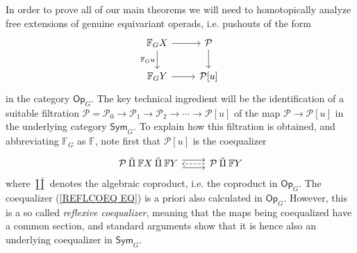 \documentclass[a4paper,10pt]{article}%
\begin{document}
In order to prove all of our main theorems
we will need to homotopically analyze free extensions 
of genuine equivariant operads,
i.e. pushouts of the form
\begin{equation}
  \label{FREE_FG_EXT_EQ}
  \begin{tikzcd}
    \mathbb{F}_G X \ar{r} \ar{d}[swap]{\mathbb{F}_G u} & \mathcal{P} \ar{d}
    \\
    \mathbb{F}_G Y \ar{r} & \mathcal{P}[u]
  \end{tikzcd}
\end{equation}
in the category $\mathsf{Op}_G$.
The key technical ingredient will be the identification of a suitable filtration
$\mathcal{P}=\mathcal{P}_0 \to 
\mathcal{P}_1 \to \mathcal{P}_2 \to
\cdots \to \mathcal{P}[u] $
of the map $\mathcal{P} \to \mathcal{P}[u]$
in the underlying category $\mathsf{Sym}_G$.
To explain how this filtration is obtained,
and abbreviating 
$\mathbb{F}_G$ as $\mathbb{F}$,
note first that $\mathcal{P}[u]$ is the coequalizer
\begin{equation}\label{REFLCOEQ EQ}
\begin{tikzcd}
	\mathcal{P} \mathbin{\check{\amalg}}
	\mathbb{F} X \mathbin{\check{\amalg}} \mathbb{F} Y
	\ar[shift right=4pt]{r} \ar[shift right=-4pt]{r}
&
	\mathcal{P} \mathbin{\check{\amalg}} \mathbb{F} Y
	\ar[dashed]{l}
\end{tikzcd}
\end{equation}
where $\check{\amalg}$ denotes the algebraic coproduct, 
i.e. the coproduct in $\mathsf{Op}_G$.
The coequalizer (\ref{REFLCOEQ EQ})
is a priori also calculated in $\mathsf{Op}_G$. However, this is a so called \textit{reflexive coequalizer}, meaning that the maps being coequalized have a common section,
and standard arguments show that 
it is hence also an underlying coequalizer in 
$\mathsf{Sym}_G$.
\end{document}
